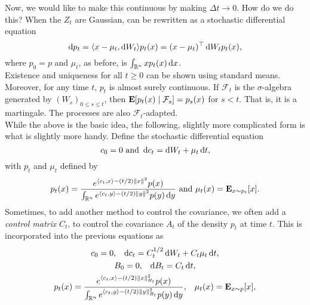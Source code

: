 		Now, we would like to make this continuous by making $\Delta t\to 0$. How do we do this? When the $Z_t$ are Gaussian,  can be rewritten as a stochastic differential equation
		\begin{equation}
			\label{eqn: continuous time stochastic localization density}
			\operatorname{d}\!{p}_t = \langle x-\mu_t,\operatorname{d}\!{W}_t\rangle p_t(x) = (x-\mu_t)^\top \operatorname{d}\!{W}_t p_t(x),
		\end{equation}
		where $p_0=p$ and $\mu_t$, as before, is $\int_{\mathbb{R}^n} x p_t(x) \operatorname{d}\!{x}$.\\
		Existence and uniqueness for all $t\geq 0$ can be shown using standard means. Moreover, for any time $t$, $p_t$ is almost surely continuous. If $\mathcal{F}_t$ is the $\sigma$-algebra generated by $(W_s)_{0\leq s\leq t}$, then $\textbf{E}[p_t(x) \mid \mathcal{F}_s] = p_s(x)$ for $s<t$. That is, it is a martingale. The processes are also $\mathcal{F}_t$-adapted.\\

		While the above is the basic idea, the following, slightly more complicated form is what is slightly more handy. Define the stochastic differential equation
		\begin{equation}
			\label{eqn: stochastic localization identity control}
			c_0 = 0 \text{ and } \operatorname{d}\!{c}_t = \operatorname{d}\!{W}_t + \mu_t\operatorname{d}\!{t},
		\end{equation}
		with $p_t$ and $\mu_t$ defined by
		\[ p_t(x) = \frac{e^{\langle c_t,x\rangle - (t/2)\left\lVert x\right\rVert^2}p(x)}{\int_{\mathbb{R}^n}e^{\langle c_t,y\rangle - (t/2)\left\lVert y\right\rVert^2}p(y)\operatorname{d}\!{y}}\text{ and } \mu_t(x) = \textbf{E}_{x\sim p_t} [x]. \]
		Sometimes, to add another method to control the covariance, we often add a \textit{control matrix} $C_t$, to control the covariance $A_t$ of the density $p_t$ at time $t$. This is incorporated into the previous equations as
		\begin{equation}
			\label{eqn: main stoch local}
			\begin{gathered}
				c_0 = 0, \;\;\; \operatorname{d}\!{c}_t = C_t^{1/2}\operatorname{d}\!{W}_t + C_t\mu_t\operatorname{d}\!{t}, \\
				B_0 = 0, \;\;\; \operatorname{d}\!{B}_t = C_t\operatorname{d}\!{t}, \\
				p_t(x) = \frac{e^{\langle c_t,x\rangle - (t/2)\left\lVert x\right\rVert_{B_t}^2}p(x)}{\int_{\mathbb{R}^n}e^{\langle c_t,y\rangle - (t/2)\left\lVert y\right\rVert_{B_t}^2}p(y)\operatorname{d}\!{y}}, \;\;\; \mu_t(x) = \textbf{E}_{x\sim p} [x], \\	
			\end{gathered}
		\end{equation}

